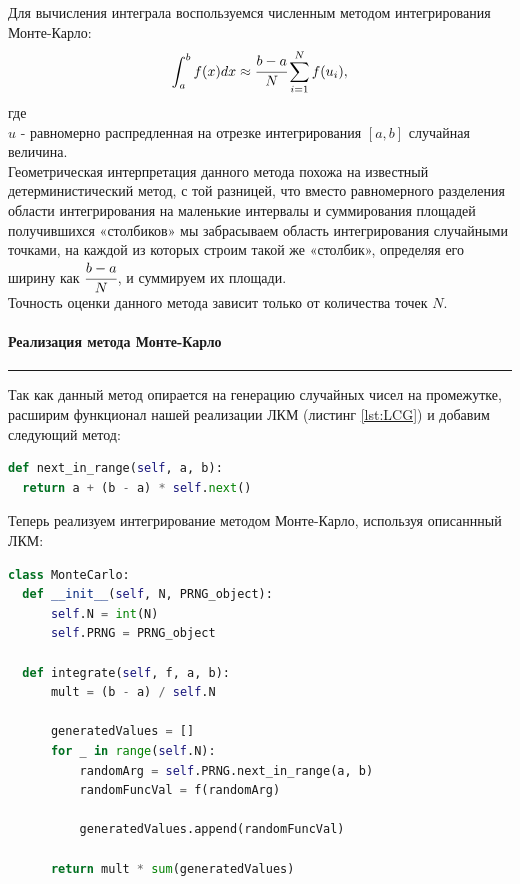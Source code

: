\documentclass[a4paper, 14pt]{extarticle}
\begin{document}
Для вычисления интеграла воспользуемся численным методом интегрирования Монте-Карло:
\begin{equation}
  \int_{a}^{b} f(x) dx \approx \cfrac{b-a}{N} \sum_{i=1}^{N} f(u_i),
\end{equation}
где\\
$u$ - равномерно распредленная на отрезке интегрирования $[a, b]$ случайная величина.\\

Геометрическая интерпретация данного метода похожа на известный детерминистический метод, 
с той разницей, что вместо равномерного разделения области интегрирования на маленькие интервалы 
и суммирования площадей получившихся «столбиков» мы забрасываем область интегрирования случайными 
точками, на каждой из которых строим такой же «столбик», определяя его ширину как 
$\cfrac{b - a}{N}$, и суммируем их площади.\\

Точность оценки данного метода зависит только от количества точек $N$.\\

\paragraph{Реализация метода Монте-Карло}\vspace{-20pt}\rule{\linewidth}{0.1mm}

Так как данный метод опирается на генерацию случайных чисел на промежутке, расширим 
функционал нашей реализации ЛКМ (листинг \ref{lst:LCG}) и добавим следующий метод:

\vspace{10pt}

\begin{center}
  \begin{lstlisting}[language=Python]
def next_in_range(self, a, b):
  return a + (b - a) * self.next()
  \end{lstlisting}
\end{center}

\vspace{10pt}

Теперь реализуем интегрирование методом Монте-Карло, используя  
описаннный ЛКМ:\\

\begin{center}
  \begin{lstlisting}[language=Python, caption={Реализация метода Монте-Карло}, label={lst:MonteCarlo}]
class MonteCarlo:
  def __init__(self, N, PRNG_object):
      self.N = int(N)
      self.PRNG = PRNG_object
  
  def integrate(self, f, a, b):
      mult = (b - a) / self.N
      
      generatedValues = []
      for _ in range(self.N):
          randomArg = self.PRNG.next_in_range(a, b)
          randomFuncVal = f(randomArg)

          generatedValues.append(randomFuncVal)
      
      return mult * sum(generatedValues)
  \end{lstlisting}
\end{center}
\end{document}
